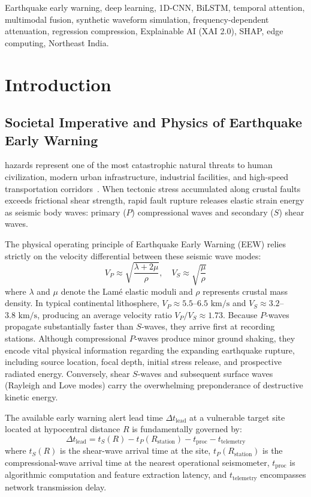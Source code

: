 \documentclass[journal]{IEEEtran}
\begin{document}
\begin{IEEEkeywords}
Earthquake early warning, deep learning, 1D-CNN, BiLSTM, temporal attention, multimodal fusion, synthetic waveform simulation, frequency-dependent attenuation, regression compression, Explainable AI (XAI 2.0), SHAP, edge computing, Northeast India.
\end{IEEEkeywords}

\section{Introduction}

\subsection{Societal Imperative and Physics of Earthquake Early Warning}
 hazards represent one of the most catastrophic natural threats to human civilization, modern urban infrastructure, industrial facilities, and high-speed transportation corridors~\cite{allen2019earthquake, kanamori2005real}. When tectonic stress accumulated along crustal faults exceeds frictional shear strength, rapid fault rupture releases elastic strain energy as seismic body waves: primary ($P$) compressional waves and secondary ($S$) shear waves. 

The physical operating principle of Earthquake Early Warning (EEW) relies strictly on the velocity differential between these seismic wave modes:
\begin{equation}
V_P \approx \sqrt{\frac{\lambda + 2\mu}{\rho}}, \quad V_S \approx \sqrt{\frac{\mu}{\rho}}
\label{eq:wave_velocities}
\end{equation}
where $\lambda$ and $\mu$ denote the Lam{\'e} elastic moduli and $\rho$ represents crustal mass density. In typical continental lithosphere, $V_P \approx 5.5$--$6.5\text{ km/s}$ and $V_S \approx 3.2$--$3.8\text{ km/s}$, producing an average velocity ratio $V_P/V_S \approx 1.73$. Because $P$-waves propagate substantially faster than $S$-waves, they arrive first at recording stations. Although compressional $P$-waves produce minor ground shaking, they encode vital physical information regarding the expanding earthquake rupture, including source location, focal depth, initial stress release, and prospective radiated energy. Conversely, shear $S$-waves and subsequent surface waves (Rayleigh and Love modes) carry the overwhelming preponderance of destructive kinetic energy.

The available early warning alert lead time $\Delta t_{\text{lead}}$ at a vulnerable target site located at hypocentral distance $R$ is fundamentally governed by:
\begin{equation}
\Delta t_{\text{lead}} = t_S(R) - t_P(R_{\text{station}}) - t_{\text{proc}} - t_{\text{telemetry}}
\label{eq:lead_time}
\end{equation}
where $t_S(R)$ is the shear-wave arrival time at the site, $t_P(R_{\text{station}})$ is the compressional-wave arrival time at the nearest operational seismometer, $t_{\text{proc}}$ is algorithmic computation and feature extraction latency, and $t_{\text{telemetry}}$ encompasses network transmission delay. 
\end{document}
